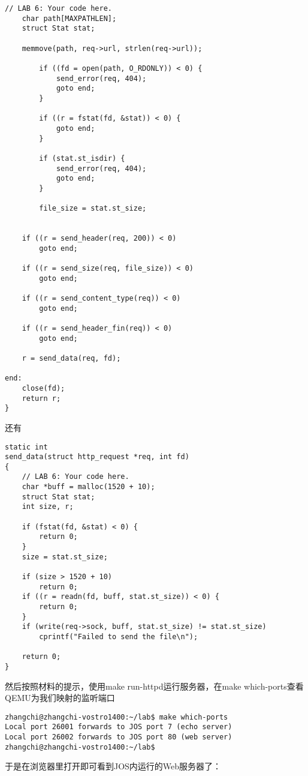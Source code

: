 \documentclass{article}
\begin{document}
\begin{CJK*}{UTF8}{gkai}
\begin{lstlisting}[style=ccode, title={\scriptsize \ttfamily \bfseries user/httpd.c: send\_file()}]
	// LAB 6: Your code here.
 	char path[MAXPATHLEN];
	struct Stat stat;

	memmove(path, req->url, strlen(req->url));

        if ((fd = open(path, O_RDONLY)) < 0) {
            send_error(req, 404);
            goto end;
        }

        if ((r = fstat(fd, &stat)) < 0) {
            goto end;
        }

        if (stat.st_isdir) {
            send_error(req, 404);
            goto end;
        }
 
        file_size = stat.st_size;


	if ((r = send_header(req, 200)) < 0)
		goto end;

	if ((r = send_size(req, file_size)) < 0)
		goto end;

	if ((r = send_content_type(req)) < 0)
		goto end;

	if ((r = send_header_fin(req)) < 0)
		goto end;

	r = send_data(req, fd);

end:
	close(fd);
	return r;
}
\end{lstlisting}

还有

\begin{lstlisting}[style=ccode, title={\scriptsize \ttfamily \bfseries user/httpd.c: send\_data()}]
static int
send_data(struct http_request *req, int fd)
{
	// LAB 6: Your code here.
	char *buff = malloc(1520 + 10);
	struct Stat stat;
	int size, r;

	if (fstat(fd, &stat) < 0) {
		return 0;
	}
	size = stat.st_size;

	if (size > 1520 + 10)
		return 0;
	if ((r = readn(fd, buff, stat.st_size)) < 0) {
		return 0;
	}
	if (write(req->sock, buff, stat.st_size) != stat.st_size)
		cprintf("Failed to send the file\n");

	return 0;
}
\end{lstlisting}

然后按照材料的提示，使用make run-httpd运行服务器，在make which-ports查看QEMU为我们映射的监听端口

\begin{lstlisting}[style=console]
zhangchi@zhangchi-vostro1400:~/lab$ make which-ports
Local port 26001 forwards to JOS port 7 (echo server)
Local port 26002 forwards to JOS port 80 (web server)
zhangchi@zhangchi-vostro1400:~/lab$ 
\end{lstlisting}

于是在浏览器里打开即可看到JOS内运行的Web服务器了：


\end{CJK*}
\end{document}
